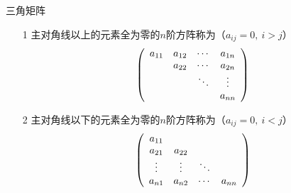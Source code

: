 \begin{frame}
  \begin{footnotesize}
    \begin{block}{三角矩阵}
      \begin{itemize}
      \item[1] 主对角线以上的元素全为零的$n$阶方阵称为（$a_{ij}=0, ~i>j$）
        $$
        \left(
          \begin{array}{cccc}
            a_{11} & a_{12} & \cdots & a_{1n} \\
                   & a_{22} & \cdots & a_{2n} \\
                   &       & \ddots & \vdots   \\
                   &       &     & a_{nn}
          \end{array}
        \right)
        $$
      \item[2] 主对角线以下的元素全为零的$n$阶方阵称为（$a_{ij}=0, ~i<j$）
        $$
        \left(
          \begin{array}{cccc}
            a_{11} &       &     &       \\
            a_{21} & a_{22} &     &  \\
            \vdots   & \vdots   & \ddots &    \\
            a_{n1} & a_{n2} & \cdots & a_{nn}
          \end{array}
        \right)
        $$
      \end{itemize}
    \end{block}
  \end{footnotesize}
\end{frame}

